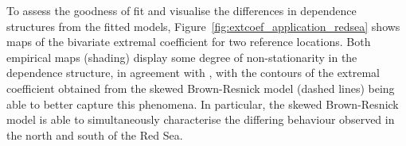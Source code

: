 \documentclass[12pt]{article}
\begin{document}

To assess the goodness of fit and visualise the differences in dependence structures from the fitted models, Figure~\ref{fig:extcoef_application_redsea} shows maps of the bivariate extremal coefficient for two reference locations. Both empirical maps  (shading) display some degree of non-stationarity in the dependence structure, in agreement with \citet{Hazra.Huser:2021}, with the contours of the extremal coefficient obtained from the skewed Brown-Resnick model (dashed lines) being able to better capture this phenomena. 
In particular, the skewed Brown-Resnick model
is able to simultaneously characterise the differing behaviour observed in the north and south of the Red Sea.
\end{document}

